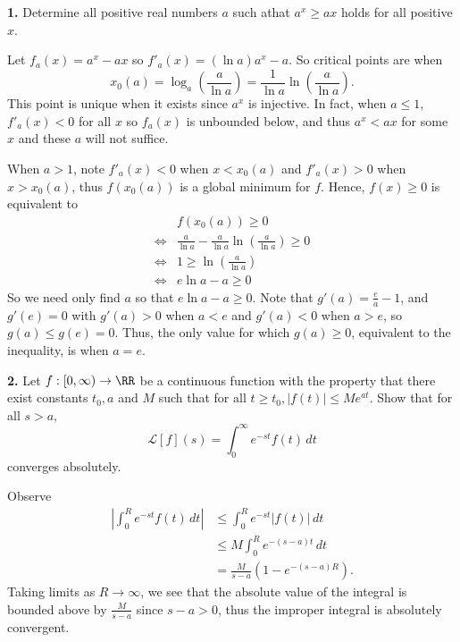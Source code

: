 \documentclass{homework}
\author{Kevin Joyce}
\begin{document}
 
\newcommand{\figref}[1]{\figurename~\ref{#1}}
\renewcommand{\bar}{\overline}
\renewcommand{\hat}{\widehat}
\renewcommand{\SS}{\mathcal S}
\newcommand{\eps}{\varepsilon}
\newcommand{\TTheta}{\overline{\underline \Theta} }
\newcommand{\del}{\partial}
\newcommand{\approxsim}{\overset{\cdotp}{\underset{\cdotp}{\sim}}}
\newcommand{\FF}{\mathcal F}
\renewcommand{\Re}{\mathrm{Re}\,}
\renewcommand{\Im}{\mathrm{Im}\,}
\newcommand{\HH}{\mathcal H}
\nocite{*}

{\bf 1. } Determine all positive real numbers $a$ such athat $a^x \ge ax$ holds for all positive $x$.

\begin{solution}
  Let $f_a(x) = a^x - ax$ so $f'_a(x) = (\ln a) a^x - a$.  So critical points are when
  $$
    x_0(a) = \log_a\left(\frac a{\ln a}\right) = \frac 1{\ln a} \ln\left(\frac a{\ln a}\right).
  $$
  This point is unique when it exists since $a^x$ is injective. In fact, when $a\le 1$, $f'_a(x) < 0$ for all $x$ 
  so $f_a(x)$ is unbounded below, and thus $a^x < ax$ for some $x$ and these $a$ will not suffice.

  When $a > 1$, note $f'_a(x) < 0$ when $x<x_0(a)$ and $f'_a(x) > 0$ when $x > x_0(a)$, thus $f(x_0(a))$ is a global minimum for $f$. 
  Hence, $f(x) \ge 0$ is equivalent to 
  \begin{align*}
    &f(x_0(a)) \ge 0 \\
    \iff&\frac a{\ln a} - \frac a{\ln a}\ln\left(\frac a{\ln a}\right) \ge 0\\
    \iff&1\ge \ln\left(\frac a{\ln a}\right)\\
    \iff&e\ln a -  a \ge 0
  \end{align*}
  So we need only find $a$ so that $e \ln a - a \ge 0$. Note that $g'(a) = \frac ea -1$, and $g'(e) = 0$ with $g'(a) > 0$ when $a<e$ and $g'(a) < 0$ when $a>e$, so $g(a) \le g(e) = 0$.  Thus, the only value for which $g(a) \ge 0$, equivalent to the inequality, is when $a=e$.
\end{solution}

{\bf 2.} Let $f:[0,\infty) \to \RR$ be a continuous function with the property that there exist constants $t_0,a$ and $M$ such that for all $t\ge t_0,|f(t)| \le Me^{at}$.  Show that for all $s>a$,
$$
\mathcal L[f](s) = \int_0^\infty e^{-st}f(t)\,dt
$$
converges absolutely.

\begin{solution}
  Observe
  \begin{align*}
    \left| \int_0^R e^{-st} f(t)\, dt\right| 
    &\le \int_0^R  e^{-st} \left|f(t)\right|\, dt \\
    &\le M \int_0^R  e^{-(s-a)t} \, dt \\
    &= \frac{M}{s-a} \left(1 - e^{-(s-a)R}\right). 
  \end{align*}
  Taking limits as $R\to \infty$, we see that the absolute value of the integral is bounded above by $\frac{M}{s-a}$ since $s-a >0$, thus the improper integral is absolutely convergent.
\end{solution}
\end{document}
